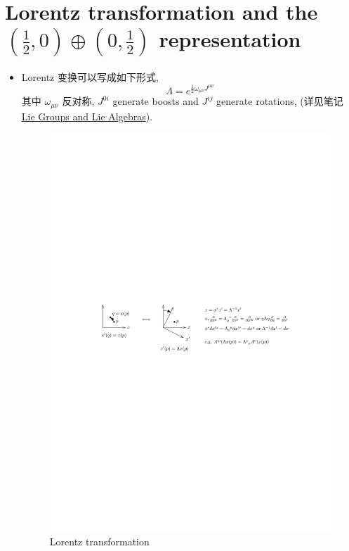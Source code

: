 \section{Lorentz transformation and the \texorpdfstring{$(\frac{1}{2}, 0) \oplus (0, \frac{1}{2})$}{(1/2, 0)+(0, 1/2)} representation}
\begin{itemize}
	\item Lorentz 变换可以写成如下形式,
	\begin{equation}
		\Lambda = e^{\frac{1}{2} \omega_{\mu \nu} J^{\mu \nu}}
	\end{equation}
	其中 $\omega_{\mu \nu}$ 反对称, $J^{0 i}$ generate boosts and $J^{i j}$ generate rotations, (详见笔记 \href{https://github.com/siyang03/my-note---Lie-Groups-and-Lie-Algebras}{Lie Groups and Lie Algebras}).
	
	\begin{figure}[H]
		\centering
		\includegraphics[scale=1]{figures/Lorentz transformation.pdf}
		\caption{Lorentz transformation}
	\end{figure}
	

\end{itemize}
